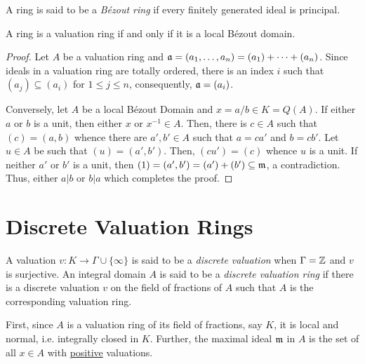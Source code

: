 \begin{definition}
    A ring is said to be a \emph{B\'ezout ring} if every finitely generated ideal is principal.
\end{definition}

\begin{proposition}
    A ring is a valuation ring if and only if it is a local B\'ezout domain.
\end{proposition}
\begin{proof}
    Let $A$ be a valuation ring and $\mathfrak a = (a_1,\ldots,a_n) = (a_1) + \cdots + (a_n)$. Since ideals in a valuation ring are totally ordered, there is an index $i$ such that $(a_j)\subseteq(a_i)$ for $1\le j\le n$, consequently, $\mathfrak a = (a_i)$.

    Conversely, let $A$ be a local B\'ezout Domain and $x = a/b\in K = Q(A)$. If either $a$ or $b$ is a unit, then either $x$ or $x^{-1}\in A$. Then, there is $c\in A$ such that $(c) = (a,b)$ whence there are $a',b'\in A$ such that $a = ca'$ and $b = cb'$. Let $u\in A$ be such that $(u) = (a',b')$. Then, $(cu') = (c)$ whence $u$ is a unit. If neither $a'$ or $b'$ is a unit, then $(1) = (a',b') = (a') + (b')\subseteq\mathfrak m$, a contradiction. Thus, either $a|b$ or $b|a$ which completes the proof.
\end{proof}

\section{Discrete Valuation Rings}

\begin{definition}
    A valuation $v: K\to\Gamma\cup\{\infty\}$ is said to be a \emph{discrete valuation} when $\Gamma = \mathbb{Z}$ and $v$ is surjective. An integral domain $A$ is said to be a \emph{discrete valuation ring} if there is a discrete valuation $v$ on the field of fractions of $A$ such that $A$ is the corresponding valuation ring.
\end{definition}

First, since $A$ is a valuation ring of its field of fractions, say $K$, it is local and normal, i.e. integrally closed in $K$. Further, the maximal ideal $\mathfrak m$ in $A$ is the set of all $x\in A$ with \underline{positive} valuations.

